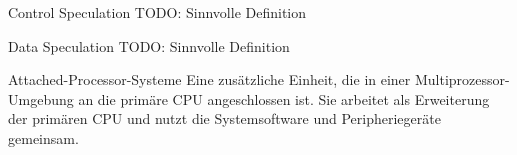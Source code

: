 \begin{defi}{Control Speculation}
    TODO: Sinnvolle Definition
\end{defi}

\begin{defi}{Data Speculation}
    TODO: Sinnvolle Definition
\end{defi}

\begin{defi}{Attached-Processor-Systeme}
    Eine zusätzliche Einheit,
    die in einer Multiprozessor-Umgebung an die primäre CPU angeschlossen ist.
    Sie arbeitet als Erweiterung der primären CPU und
    nutzt die Systemsoftware und Peripheriegeräte gemeinsam.
\end{defi}
